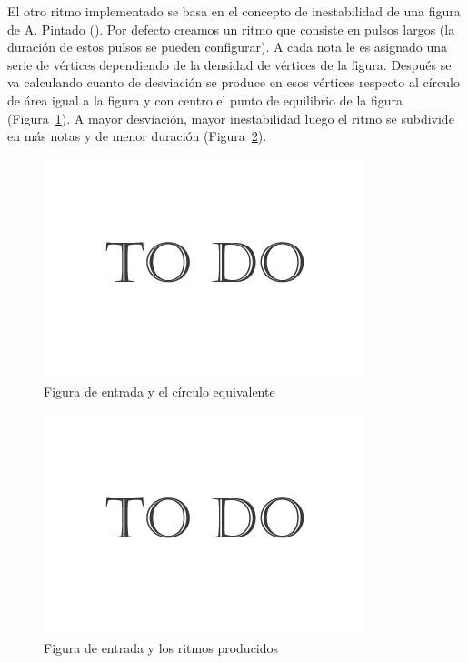 El otro ritmo implementado se basa en el concepto de inestabilidad de una figura de A. Pintado (\cite{portutesis}). Por defecto creamos un ritmo que consiste en pulsos largos (la duración de estos pulsos se pueden configurar). A cada nota le es asignado una serie de vértices dependiendo de la densidad de vértices de la figura. Después se va calculando cuanto de desviación se produce en esos vértices respecto al círculo de área igual a la figura y con centro el punto de equilibrio de la figura (Figura~\ref{fig:Figura2Voz4}). A mayor desviación, mayor inestabilidad luego el ritmo se subdivide en más notas y de menor duración (Figura~\ref{fig:Figura3Voz4}).

		\begin{figure}[htbp]
		\centering
		\hspace*{0.0in}
		\includegraphics[scale=0.57]{graphics/todo.png}
		\caption{Figura de entrada y el círculo equivalente}
		\label{fig:Figura2Voz4}
		\end{figure}

		\begin{figure}[htbp]
		\centering
		\hspace*{0.0in}
		\includegraphics[scale=0.57]{graphics/todo.png}
		\caption{Figura de entrada y los ritmos producidos}
		\label{fig:Figura3Voz4}
		\end{figure}

